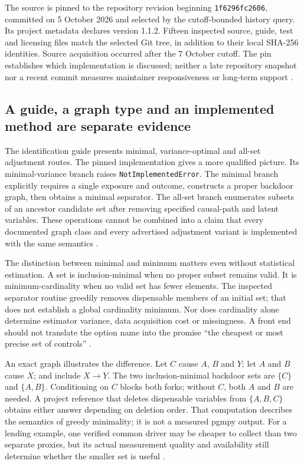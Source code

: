 The source is pinned to the repository revision beginning
\texttt{1f6296fc2606}, committed on 5 October 2026 and selected by the
cutoff-bounded history query. Its project metadata declares version 1.1.2.
Fifteen inspected source, guide, test and licensing files match the selected
Git tree, in addition to their local SHA-256 identities. Source acquisition
occurred after the 7 October cutoff. The pin establishes which implementation
is discussed; neither a late repository snapshot nor a recent commit measures
maintainer responsiveness or long-term support
\cite{exec13_pgmpy_reuse_primary}.

\subsection{A guide, a graph type and an implemented method are separate evidence}

The identification guide presents minimal, variance-optimal and all-set
adjustment routes. The pinned implementation gives a more qualified picture.
Its minimal-variance branch raises \texttt{NotImplementedError}. The minimal
branch explicitly requires a single exposure and outcome, constructs a
proper backdoor graph, then obtains a minimal separator. The all-set branch
enumerates subsets of an ancestor candidate set after removing specified
causal-path and latent variables. These operations cannot be combined into
a claim that every documented graph class and every advertised adjustment
variant is implemented with the same semantics
\cite{exec13_pgmpy_reuse_primary}.

The distinction between minimal and minimum matters even without statistical
estimation. A set is inclusion-minimal when no proper subset remains valid.
It is minimum-cardinality when no valid set has fewer elements. The inspected
separator routine greedily removes dispensable members of an initial set;
that does not establish a global cardinality minimum. Nor does cardinality
alone determine estimator variance, data acquisition cost or missingness.
A front end should not translate the option name into the promise
``the cheapest or most precise set of controls''
\cite{exec13_pgmpy_reuse_primary}.

An exact graph illustrates the difference. Let $C$ cause $A$, $B$ and $Y$;
let $A$ and $B$ cause $X$; and include $X\to Y$. The two inclusion-minimal
backdoor sets are $\{C\}$ and $\{A,B\}$. Conditioning on $C$ blocks both
forks; without $C$, both $A$ and $B$ are needed. A project reference that
deletes dispensable variables from $\{A,B,C\}$ obtains either answer
depending on deletion order. That computation describes the semantics of
greedy minimality; it is not a measured pgmpy output. For a lending example,
one verified common driver may be cheaper to collect than two separate
proxies, but its actual measurement quality and availability still determine
whether the smaller set is useful \cite{exec13_pgmpy_reuse_oracle}.

